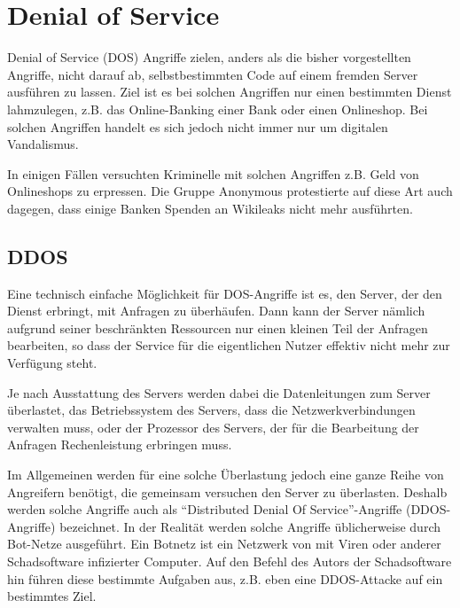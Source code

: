 \section{Denial of Service}

Denial of Service (DOS) Angriffe zielen, anders als die bisher vorgestellten Angriffe, nicht darauf ab, selbstbestimmten Code auf einem fremden Server ausführen zu lassen.
Ziel ist es bei solchen Angriffen nur einen bestimmten Dienst lahmzulegen, z.B. das Online-Banking einer Bank oder einen Onlineshop.
Bei solchen Angriffen handelt es sich jedoch nicht immer nur um digitalen Vandalismus.

In einigen Fällen versuchten Kriminelle mit solchen Angriffen z.B. Geld von Onlineshops zu erpressen.
Die Gruppe Anonymous protestierte auf diese Art auch dagegen, dass einige Banken Spenden an Wikileaks nicht mehr ausführten.\\

\subsection{DDOS}

Eine technisch einfache Möglichkeit für DOS-Angriffe ist es, den Server, der den Dienst erbringt, mit Anfragen zu überhäufen. Dann kann der Server nämlich aufgrund seiner beschränkten Ressourcen nur einen kleinen Teil der Anfragen bearbeiten, so dass der Service für die eigentlichen Nutzer effektiv nicht mehr zur Verfügung steht.

Je nach Ausstattung des Servers werden dabei die Datenleitungen zum Server überlastet, das Betriebssystem des Servers, dass die Netzwerkverbindungen verwalten muss, oder der Prozessor des Servers, der für die Bearbeitung der Anfragen Rechenleistung erbringen muss.

Im Allgemeinen werden für eine solche Überlastung jedoch eine ganze Reihe von Angreifern benötigt, die gemeinsam versuchen den Server zu überlasten.
Deshalb werden solche Angriffe auch als "`Distributed Denial Of Service"'-Angriffe (DDOS-Angriffe) bezeichnet.
In der Realität werden solche Angriffe üblicherweise durch Bot-Netze ausgeführt.
Ein Botnetz ist ein Netzwerk von mit Viren oder anderer Schadsoftware infizierter Computer.
Auf den Befehl des Autors der Schadsoftware hin führen diese bestimmte Aufgaben aus, z.B. eben eine DDOS-Attacke auf ein bestimmtes Ziel.\\


